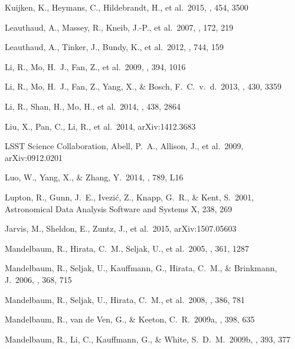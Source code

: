 \documentclass[apj]{emulateapj}
\begin{document}
\begin{thebibliography}{}
 Kuijken, K., Heymans, 
C., Hildebrandt, H., et al.\ 2015, \mnras, 454, 3500 


 Leauthaud, A.,
Massey, R., Kneib, J.-P., et al.\ 2007, \apjs, 172, 219


  Leauthaud, A.,
  Tinker, J., Bundy, K., et al.\ 2012, \apj, 744, 159

  Li, R., Mo, H.~J., Fan, Z.,
  et al.\ 2009, \mnras, 394, 1016

  Li, R., Mo, H.~J., Fan, Z.,
Yang, X., \& Bosch, F.~C.~v.~d.\ 2013, \mnras, 430, 3359


  Li, R., Shan, H., Mo, H., et
  al.\ 2014, \mnras, 438, 2864


  Liu, X., Pan, C., Li, R.,
  et al.\ 2014, arXiv:1412.3683
  
   LSST 
Science Collaboration, Abell, P.~A., Allison, J., et al.\ 2009, 
arXiv:0912.0201 


 Luo, W., Yang, X.,
\& Zhang, Y.\ 2014, \apjl, 789, L16


  Lupton, R., Gunn, J.~E.,
Ivezi{\'c}, Z., Knapp, G.~R.,
\& Kent, S.\ 2001, Astronomical Data Analysis Software and Systems X, 238, 269

 Jarvis, M., Sheldon, E., 
Zuntz, J., et al.\ 2015, arXiv:1507.05603 


  Mandelbaum, R.,
  Hirata, C.~M., Seljak, U., et al.\ 2005, \mnras, 361, 1287


 Mandelbaum, R.,
  Seljak, U., Kauffmann, G., Hirata, C.~M., \& Brinkmann, J.\ 2006,
  \mnras, 368, 715


  Mandelbaum, R.,
  Seljak, U., Hirata, C.~M., et al.\ 2008, \mnras, 386, 781

  Mandelbaum, R., van
  de Ven, G., \& Keeton, C.~R.\ 2009a, \mnras, 398, 635


  Mandelbaum, R., Li,
  C., Kauffmann, G., \& White, S.~D.~M.\ 2009b, \mnras, 393, 377



\end{thebibliography}
\end{document}
